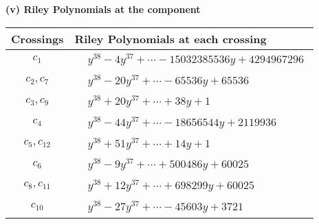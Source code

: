 \documentclass[1p]{elsarticle_modified}
\theoremstyle{definition}
\begin{document}
\newpage\renewcommand{\arraystretch}{1}
\flushleft \textbf{(v) Riley Polynomials at the component}\newline \\
\begin{tabular}{m{50pt}|m{274pt}}
Crossings & \hspace{64pt}Riley Polynomials at each crossing \\
\hline $$\begin{aligned}c_{1}\end{aligned}$$&$\begin{aligned}
&y^{38}-4 y^{37}+\cdots-15032385536 y+4294967296
\end{aligned}$\\
\hline $$\begin{aligned}c_{2},c_{7}\end{aligned}$$&$\begin{aligned}
&y^{38}-20 y^{37}+\cdots-65536 y+65536
\end{aligned}$\\
\hline $$\begin{aligned}c_{3},c_{9}\end{aligned}$$&$\begin{aligned}
&y^{38}+20 y^{37}+\cdots+38 y+1
\end{aligned}$\\
\hline $$\begin{aligned}c_{4}\end{aligned}$$&$\begin{aligned}
&y^{38}-44 y^{37}+\cdots-18656544 y+2119936
\end{aligned}$\\
\hline $$\begin{aligned}c_{5},c_{12}\end{aligned}$$&$\begin{aligned}
&y^{38}+51 y^{37}+\cdots+14 y+1
\end{aligned}$\\
\hline $$\begin{aligned}c_{6}\end{aligned}$$&$\begin{aligned}
&y^{38}-9 y^{37}+\cdots+500486 y+60025
\end{aligned}$\\
\hline $$\begin{aligned}c_{8},c_{11}\end{aligned}$$&$\begin{aligned}
&y^{38}+12 y^{37}+\cdots+698299 y+60025
\end{aligned}$\\
\hline $$\begin{aligned}c_{10}\end{aligned}$$&$\begin{aligned}
&y^{38}-27 y^{37}+\cdots-45603 y+3721
\end{aligned}$\\
\hline
\end{tabular}\\~\\
\end{document}
